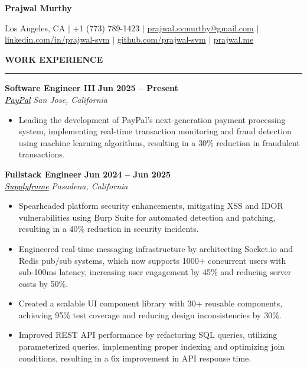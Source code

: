 \documentclass[10pt,letterpaper]{article}
\begin{document}
{\centering\huge\textbf{Prajwal Murthy}\par}
\vspace{2mm}
{\centering\small{Los Angeles, CA $|$ +1 (773) 789-1423 $|$  \href{mailto:prajwal.svmurthy@gmail.com}{prajwal.svmurthy@gmail.com} $|$ \href{https://linkedin.com/in/prajwal-svm}{linkedin.com/in/prajwal-svm} $|$  \href{https://github.com/prajwal-svm}{github.com/prajwal-svm}  $|$   \href{https://prajwal.me}{prajwal.me}}\par}
\vspace{1mm}

{\hspace{0in}\small\textbf{WORK EXPERIENCE}}\par
\vspace{-2mm}
\noindent\rule{\textwidth}{0.1pt}
\vspace{-4mm}

\hspace{0in}\textbf{Software Engineer III} \hfill \textbf{Jun 2025 -- Present}\\
\hspace{0in}\textit{\href{https://paypal.com}{\textcolor{black}{PayPal}}} \hfill \textit{San Jose, California} 
\begin{itemize}[leftmargin=0.15in,nosep,topsep=3pt,itemsep=1mm]
   \item Leading the development of PayPal's next-generation payment processing system, implementing real-time transaction monitoring and fraud detection using machine learning algorithms, resulting in a 30\% reduction in fraudulent transactions.
\end{itemize}

\vspace{1mm}
\hspace{0in}\textbf{Fullstack Engineer} \hfill \textbf{Jun 2024 -- Jun 2025}\\
\hspace{0in}\textit{\href{https://supplyframe.com}{\textcolor{black}{Supplyframe}}} \hfill \textit{Pasadena, California} 
\begin{itemize}[leftmargin=0.15in,nosep,topsep=3pt,itemsep=1mm]
   \item Spearheaded platform security enhancements, mitigating XSS and IDOR vulnerabilities using Burp Suite for automated detection and patching, resulting in a 40\% reduction in security incidents.
   \item Engineered real-time messaging infrastructure by architecting Socket.io and Redis pub/sub systems, which now supports 1000+ concurrent users with sub-100ms latency, increasing user engagement by 45\% and reducing server costs by 50\%.
   \item Created a scalable UI component library with 30+ reusable components, achieving 95\% test coverage and reducing design inconsistencies by 30\%.
   \item Improved REST API performance by refactoring SQL queries, utilizing parameterized queries, implementing proper indexing and optimizing join conditions, resulting in a 6x improvement in API response time.
\end{itemize}
\end{document}
